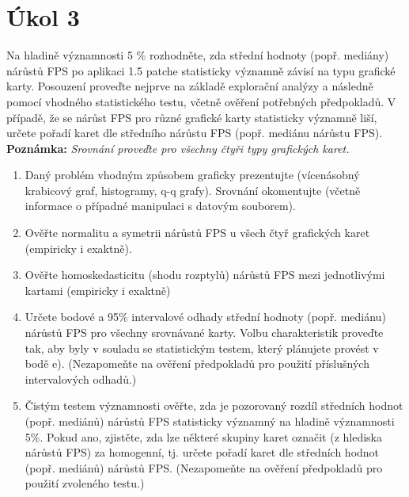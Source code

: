 \section*{Úkol 3}
\label{sec:task-3}

Na hladině významnosti 5 \% rozhodněte, zda střední hodnoty (popř. mediány) nárůstů FPS po aplikaci 1.5 patche statisticky významně závisí na typu 
grafické karty. Posouzení proveďte nejprve na základě explorační analýzy a následně pomocí vhodného statistického testu, včetně ověření potřebných 
předpokladů. V případě, že se nárůst FPS pro různé grafické karty statisticky významně liší, určete pořadí karet dle středního nárůstu FPS (popř. mediánu nárůstu FPS). 
\textbf{Poznámka:} \textit{Srovnání proveďte pro všechny čtyři typy grafických karet.}

\begin{enumerate}[label=\alph*]
    \item Daný problém vhodným způsobem graficky prezentujte (vícenásobný krabicový graf, histogramy, q-q grafy). 
    Srovnání okomentujte (včetně informace o případné manipulaci s datovým souborem).
    
    \newpage
    \item Ověřte normalitu a symetrii nárůstů FPS u všech čtyř grafických karet (empiricky i exaktně).
    
    \newpage
    \item Ověřte homoskedasticitu (shodu rozptylů) nárůstů FPS mezi jednotlivými kartami (empiricky i exaktně)
    
    \newpage
    \item Určete bodové a 95\% intervalové odhady střední hodnoty (popř. mediánu) nárůstů FPS pro všechny srovnávané karty. 
    Volbu charakteristik proveďte tak, aby byly v souladu se statistickým testem, který plánujete provést v bodě e). 
    (Nezapomeňte na ověření předpokladů pro použití příslušných intervalových odhadů.)
    
    \newpage
    \item Čistým testem významnosti ověřte, zda je pozorovaný rozdíl středních hodnot (popř. mediánů) nárůstů FPS statisticky 
    významný na hladině významnosti 5\%. Pokud ano, zjistěte, zda lze některé skupiny karet označit (z hlediska nárůstů FPS)
    za homogenní, tj. určete pořadí karet dle středních hodnot (popř. mediánů) nárůstů FPS. 
    (Nezapomeňte na ověření předpokladů pro použití zvoleného testu.)
\end{enumerate}

\endinput